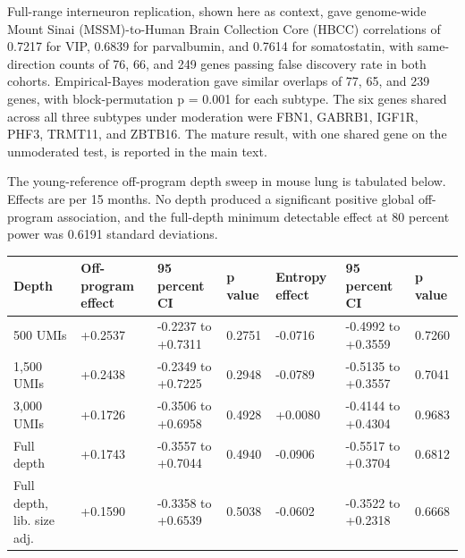 \documentclass[11pt]{article}
\begin{document}
Full-range interneuron replication, shown here as context, gave genome-wide Mount Sinai (MSSM)-to-Human Brain Collection Core (HBCC) correlations of 0.7217 for VIP, 0.6839 for parvalbumin, and 0.7614 for somatostatin, with same-direction counts of 76, 66, and 249 genes passing false discovery rate in both cohorts. Empirical-Bayes moderation gave similar overlaps of 77, 65, and 239 genes, with block-permutation p = 0.001 for each subtype. The six genes shared across all three subtypes under moderation were FBN1, GABRB1, IGF1R, PHF3, TRMT11, and ZBTB16. The mature result, with one shared gene on the unmoderated test, is reported in the main text.

The young-reference off-program depth sweep in mouse lung is tabulated below. Effects are per 15 months. No depth produced a significant positive global off-program association, and the full-depth minimum detectable effect at 80 percent power was 0.6191 standard deviations.

{\scriptsize\begin{longtable}{lllllll}

Depth & Off-program effect & 95 percent CI & p value & Entropy effect & 95 percent CI & p value \\

\hline

500 UMIs & +0.2537 & -0.2237 to +0.7311 & 0.2751 & -0.0716 & -0.4992 to +0.3559 & 0.7260 \\

1,500 UMIs & +0.2438 & -0.2349 to +0.7225 & 0.2948 & -0.0789 & -0.5135 to +0.3557 & 0.7041 \\

3,000 UMIs & +0.1726 & -0.3506 to +0.6958 & 0.4928 & +0.0080 & -0.4144 to +0.4304 & 0.9683 \\

Full depth & +0.1743 & -0.3557 to +0.7044 & 0.4940 & -0.0906 & -0.5517 to +0.3704 & 0.6812 \\

Full depth, lib. size adj. & +0.1590 & -0.3358 to +0.6539 & 0.5038 & -0.0602 & -0.3522 to +0.2318 & 0.6668 \\

\end{longtable}}
\end{document}
